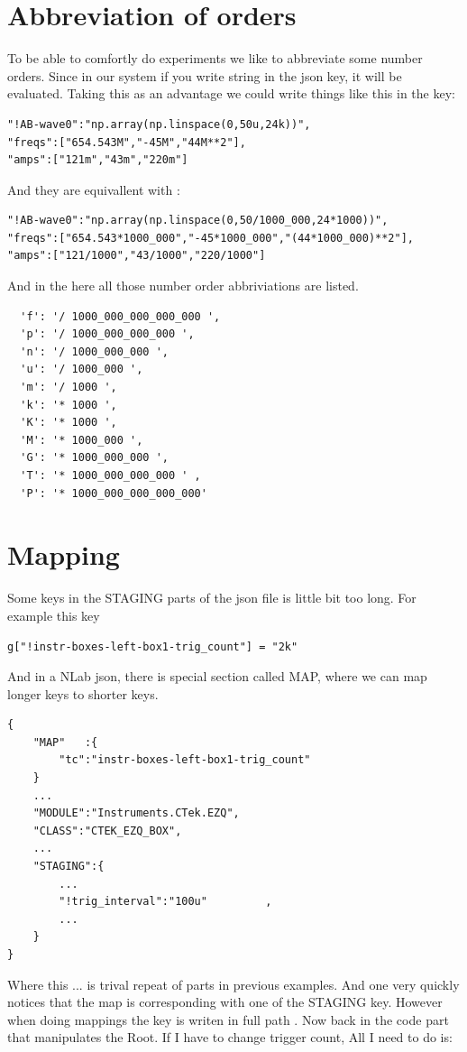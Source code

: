 \documentclass{article}
\begin{document}
\section{Abbreviation of orders}
To be able to comfortly do experiments we like to 
	abbreviate some number orders.
Since in our system if you write string in the json key,
	it will be evaluated.
Taking this as an advantage we could write things like this in the key:


\begin{lstlisting}
"!AB-wave0":"np.array(np.linspace(0,50u,24k))",
"freqs":["654.543M","-45M","44M**2"],
"amps":["121m","43m","220m"]
\end{lstlisting}

And they are equivallent with :

\begin{lstlisting}
"!AB-wave0":"np.array(np.linspace(0,50/1000_000,24*1000))",
"freqs":["654.543*1000_000","-45*1000_000","(44*1000_000)**2"],
"amps":["121/1000","43/1000","220/1000"]
\end{lstlisting}


And in the here all those number order abbriviations
are listed.
\begin{lstlisting}
  'f': '/ 1000_000_000_000_000 ',
  'p': '/ 1000_000_000_000 ',
  'n': '/ 1000_000_000 ',
  'u': '/ 1000_000 ',
  'm': '/ 1000 ',
  'k': '* 1000 ', 
  'K': '* 1000 ',
  'M': '* 1000_000 ',
  'G': '* 1000_000_000 ',
  'T': '* 1000_000_000_000 ' , 
  'P': '* 1000_000_000_000_000'
\end{lstlisting}


\section{Mapping}
Some keys in the STAGING parts of the json file is 
	little bit too long.
For example  this key

\begin{lstlisting}
g["!instr-boxes-left-box1-trig_count"] = "2k"
\end{lstlisting}
And in a NLab json, there is special section called MAP,
where we can map longer keys to shorter keys.


\begin{lstlisting}
{
	"MAP"	:{
		"tc":"instr-boxes-left-box1-trig_count"
	}
	...	
	"MODULE":"Instruments.CTek.EZQ",
	"CLASS":"CTEK_EZQ_BOX", 
	...	
	"STAGING":{
		...	
		"!trig_interval":"100u"			,
		...	
	}
}
\end{lstlisting}
Where this ... is trival repeat of parts in previous examples.
And one very quickly notices that the map is corresponding with
	one of the STAGING key. 
However when doing mappings the key is writen in full path .
Now back in the code part that manipulates the Root. 
If I have to  change trigger count, All I need to do is:
\end{document}
